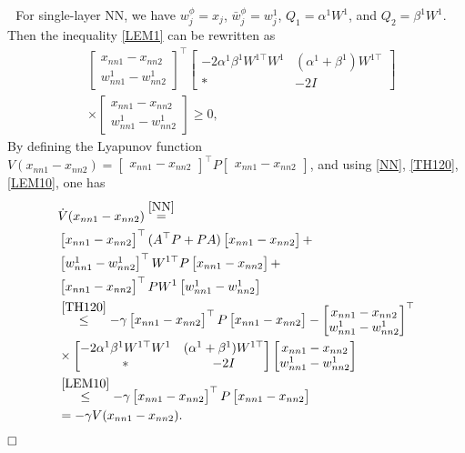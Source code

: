 \documentclass[journal,twoside,web]{ieeecolor}
\renewenvironment{proof}{\vspace{.1cm}\noindent{\sc Proof.}\hspace{0.10cm}\,\,}{$\hfill\Box$\vspace{.1cm}}
\newcommand{\bbm}[1]{\left[\begin{matrix} #1 \end{matrix}\right]}
\begin{document}
\begin{proof}
  For single-layer NN, we have $w_j^\phi=x_j$, $\bar{w}_j^\phi=w_j^1$, $Q_1=\alpha^1W^1$, and $Q_2=\beta^1W^1$. Then the inequality \eqref{LEM1} can be rewritten as
  \begin{equation}\label{LEM10}
 \begin{aligned}
&\begin{bmatrix}
x_{nn1}-x_{nn2}
 \\
w_{nn1}^1-w_{nn2}^1
\end{bmatrix}^\top \begin{bmatrix}
 -2\alpha^1\beta^1W^{1\top} W^1 &(\alpha^1+\beta^1)W^{1\top}
 \\
\ast&-2I
\end{bmatrix}\\&\times\begin{bmatrix}
x_{nn1}-x_{nn2}
 \\
w_{nn1}^1-w_{nn2}^1
\end{bmatrix}\geq 0, 
\end{aligned}
\end{equation}
By defining the Lyapunov function $V(x_{nn1}-x_{nn2})=\bbm{x_{nn1}-x_{nn2}}^\top P \bbm{x_{nn1}-x_{nn2}}$, and using \eqref{NN}, \eqref{TH120}, \eqref{LEM10}, one has  
\begin{equation}\label{CO0P1}
\begin{aligned}
&\dot{V}(x_{nn1}-x_{nn2})\overset{\eqref{NN}}{=}\\&\bbm{x_{nn1}-x_{nn2}}^\top( A^\top P+PA)\bbm{x_{nn1}-x_{nn2}}+\\&\bbm{w_{nn1}^1-w_{nn2}^1}^\top W^{1\top}P\bbm{x_{nn1}-x_{nn2}}+\\&\bbm{x_{nn1}-x_{nn2}}^\top PW^1\bbm{w_{nn1}^1-w_{nn2}^1}\\&\overset{\eqref{TH120}}{\leq}-\gamma \bbm{x_{nn1}-x_{nn2}}^\top P \bbm{x_{nn1}-x_{nn2}}-\begin{bmatrix}
x_{nn1}-x_{nn2}
 \\
w_{nn1}^1-w_{nn2}^1
\end{bmatrix}^\top \\&\times \begin{bmatrix}
 -2\alpha^1\beta^1W^{1\top} W^1 &(\alpha^1+\beta^1)W^{1\top}
 \\
\ast&-2I
\end{bmatrix}\begin{bmatrix}
x_{nn1}-x_{nn2}
 \\
w_{nn1}^1-w_{nn2}^1
\end{bmatrix}\\&\overset{\eqref{LEM10}}{\leq}  -\gamma \bbm{x_{nn1}-x_{nn2}}^\top P \bbm{x_{nn1}-x_{nn2}}\\&=-\gamma V(x_{nn1}-x_{nn2}).

\end{aligned}
\end{equation}
\end{proof}
\end{document}
